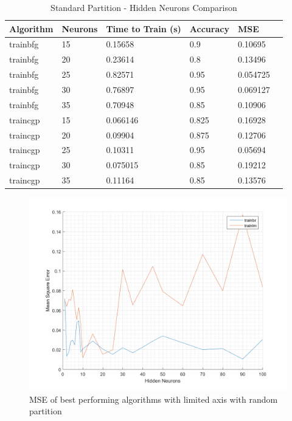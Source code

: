 \documentclass[a4paper, 10pt, conference]{ieeeconf}
\begin{document}
\begin{table}
\centering
\caption{Standard Partition - Hidden Neurons Comparison}
\label{tbl:unmixed}
\begin{tabular}{llllll}
\hline
\textbf{Algorithm} & \textbf{Neurons} & \textbf{Time to Train (s)} & \textbf{Accuracy} & \textbf{MSE} \\ \hline
trainbfg & 15 & 0.15658 & 0.9 & 0.10695 \\ \hline
trainbfg & 20 & 0.23614 & 0.8 & 0.13496 \\ \hline
trainbfg & 25 & 0.82571 & 0.95 & 0.054725 \\ \hline
trainbfg & 30 & 0.76897 & 0.95 & 0.069127 \\ \hline
trainbfg & 35 & 0.70948 & 0.85 & 0.10906 \\ \hline

traincgp & 15 & 0.066146 & 0.825 & 0.16928 \\ \hline
traincgp & 20 & 0.09904 & 0.875 & 0.12706 \\ \hline
traincgp & 25 & 0.10311 & 0.95 & 0.05694 \\ \hline
traincgp & 30 & 0.075015 & 0.85 & 0.19212 \\ \hline
traincgp & 35 & 0.11164 & 0.85 & 0.13576 \\ \hline
\end{tabular}
\end{table}

\begin{figure}[!ht]
    \centering
    \includegraphics[width=\linewidth]{pic/mixed_best_limited.png}
    \caption{MSE of best performing algorithms with limited axis with random partition}
    \label{fig:mixed_limited}
\end{figure}
\end{document}
